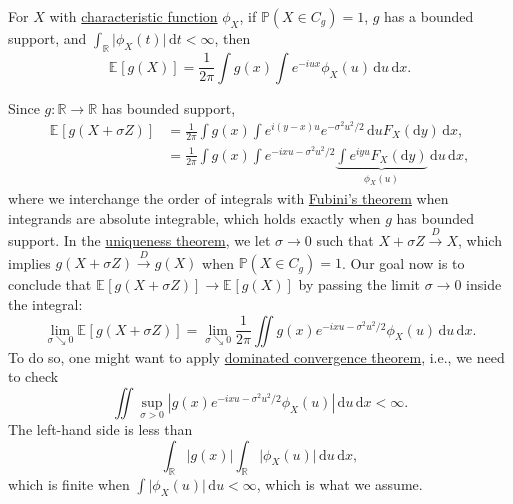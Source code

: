 \begin{remark}
	For \(X\) with \hyperref[def:characteristic-function]{characteristic function} \(\phi _X\), if \(\mathbb{P} (X \in C_g) = 1\), \(g\) has a bounded support, and \(\int _\mathbb{R} \vert \phi _X(t) \vert \,\mathrm{d} t < \infty \), then
	\[
		\mathbb{E}_{}[g(X)]
		= \frac{1}{2\pi } \int g(x) \int e^{-iux} \phi _X(u) \,\mathrm{d} u \,\mathrm{d} x .
	\]
\end{remark}
\begin{explanation}
	Since \(g\colon \mathbb{R} \to \mathbb{R} \) has bounded support,
	\begin{align*}
		\mathbb{E}_{}[g(X + \sigma Z)]
		 & = \frac{1}{2\pi } \int g(x) \int e^{i (y - x) u} e^{- \sigma ^2 u^2 / 2} \,\mathrm{d} u F_X(\mathrm{d} y) \,\mathrm{d} x , \tag*{\(z / \sigma \eqqcolon u\)} \\
		 & = \frac{1}{2\pi } \int g(x) \int e^{-i x u - \sigma ^2 u^2 / 2} \underbrace{\int e^{i y u} F_X(\mathrm{d} y)}_{\phi _X(u)} \,\mathrm{d} u \,\mathrm{d} x ,
	\end{align*}
	where we interchange the order of integrals with \href{https://en.wikipedia.org/wiki/Fubini's_theorem}{Fubini's theorem} when integrands are absolute integrable, which holds exactly when \(g\) has bounded support. In the \hyperref[thm:characteristic-function-uniqueness]{uniqueness theorem}, we let \(\sigma \to 0\) such that \(X+ \sigma Z \overset{D}{\to } X\), which implies \(g(X + \sigma Z) \overset{D}{\to } g(X)\) when \(\mathbb{P} (X \in C_g) = 1\). Our goal now is to conclude that \(\mathbb{E}_{}[g(X + \sigma Z)] \to \mathbb{E}_{}[g(X)] \) by passing the limit \(\sigma \to 0\) inside the integral:
	\[
		\lim_{\sigma \searrow 0} \mathbb{E}_{}[g(X + \sigma Z)]
		= \lim_{\sigma \searrow 0} \frac{1}{2\pi } \iint g(x) e^{-i x u - \sigma ^2 u^2 / 2} \phi _X(u) \,\mathrm{d} u \,\mathrm{d} x .
	\]
	To do so, one might want to apply \href{https://en.wikipedia.org/wiki/Dominated_convergence_theorem}{dominated convergence theorem}, i.e., we need to check
	\[
		\iint \sup _{\sigma > 0} \left\vert g(x) e^{-i x u - \sigma ^2 u^2 / 2} \phi _X (u) \right\vert \,\mathrm{d} u \,\mathrm{d} x < \infty .
	\]
	The left-hand side is less than
	\[
		\int _\mathbb{R} \vert g(x) \vert \int _\mathbb{R} \vert \phi _X(u) \vert \,\mathrm{d} u \,\mathrm{d} x ,
	\]
	which is finite when \(\int \vert \phi _X(u) \vert \,\mathrm{d} u < \infty \), which is what we assume.
\end{explanation}

